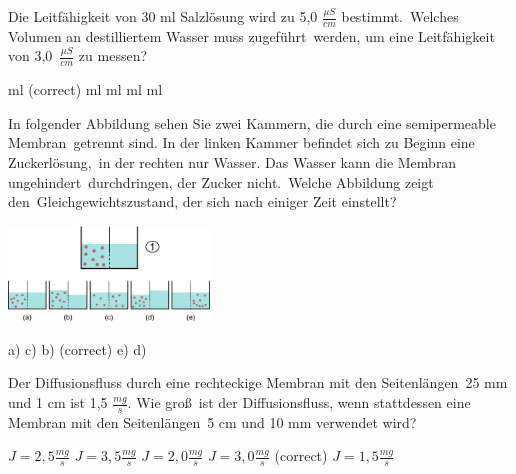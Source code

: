 \documentclass[11pt]{exam}
\begin{document}
\setlength{\voffset}{-0.5in}
\setlength{\headsep}{5pt}

\hspace{2mm}
 \hspace{5mm}
\vspace{4mm}

\begin{questions}

\question Die Leitfähigkeit von 30 ml Salzlösung wird zu 5,0 \( \frac{\mu S}{cm} \) bestimmt. Welches Volumen an destilliertem Wasser muss zugeführt werden, um eine Leitfähigkeit von 3,0 \( \frac{\mu S}{cm} \) zu messen?

\begin{choices}
	 ml (correct)
	 ml
	 ml
	 ml
	 ml
\end{choices}

\vspace{3mm}\question In folgender Abbildung sehen Sie zwei Kammern, die durch eine semipermeable Membran getrennt sind. In der linken Kammer befindet sich zu Beginn eine Zuckerlösung, in der rechten nur Wasser. Das Wasser kann die Membran ungehindert durchdringen, der Zucker nicht. Welche Abbildung zeigt den Gleichgewichtszustand, der sich nach einiger Zeit einstellt? 

\includegraphics[width=0.4\textwidth]{images/Osmose.png}

\begin{choices}
	\choice a)
	\choice c)
	\choice b) (correct)
	\choice e)
	\choice d)
\end{choices}

\vspace{3mm}\question Der Diffusionsfluss durch eine rechteckige Membran mit den Seitenlängen 25 mm und 1 cm ist 1,5 \(\frac{mg}{s} \). Wie groß ist der Diffusionsfluss, wenn stattdessen eine Membran mit den Seitenlängen 5 cm und 10 mm verwendet wird?

\begin{choices}
	\choice \( J = 2,5 \frac{mg}{s} \)
	\choice \( J = 3,5 \frac{mg}{s} \)
	\choice \( J = 2,0 \frac{mg}{s} \)
	\choice \( J = 3,0 \frac{mg}{s} \) (correct)
	\choice \( J = 1,5 \frac{mg}{s} \)
\end{choices}


\end{questions}
\end{document}
